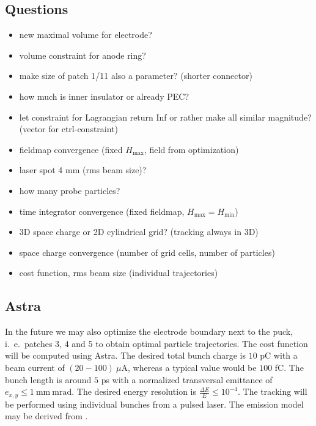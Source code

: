 \subsection{Questions}
\begin{itemize}
   \item new maximal volume for electrode?
   \item volume constraint for anode ring?
   \item make size of patch 1/11 also a parameter? (shorter connector)
   \item how much is inner insulator or already PEC?\\

   \item let constraint for Lagrangian return Inf or rather make all similar
   magnitude? (vector for ctrl-constraint)\\

   \item fieldmap convergence (fixed $H_\mathrm{max}$, field from optimization)
   \item laser spot 4 mm (rms beam size)?
   \item how many probe particles?
   \item time integrator convergence (fixed fieldmap, $H_\mathrm{max}=H_\mathrm{min}$)
   \item 3D space charge or 2D cylindrical grid? (tracking always in 3D)
   \item space charge convergence (number of grid cells, number of particles)\\

   \item cost function, rms beam size (individual trajectories)
\end{itemize}

\subsection{Astra}
In the future we may also optimize the electrode boundary next to the puck, i.~e.~patches 3, 4 and 5 to obtain optimal particle trajectories. The cost function will be computed using Astra.
The desired total bunch charge is $10$ pC with a beam current of $(20-100)\ \mu\mathrm{A}$, whereas a typical value would be $100$ fC. The bunch length is around $5$ ps with a normalized transversal emittance of $e_{x,y} \leq 1\ \mathrm{mm\: mrad}$. The desired energy resolution is $\frac{\Delta E}{E} \leq 10^{-4}$.
The tracking will be performed using individual bunches from a pulsed laser. The emission model may be derived from \cite{wagner}.
